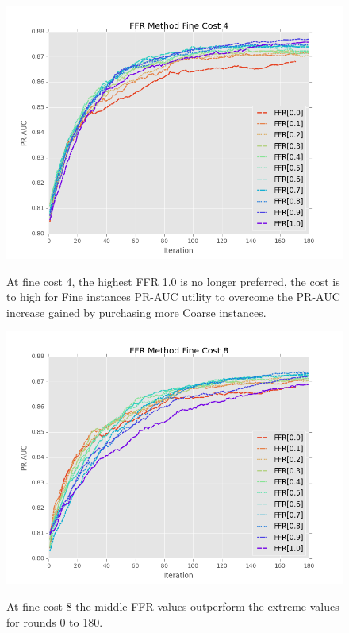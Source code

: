 \documentclass[ms]{nuthesis}
\begin{document}
\FloatBarrier
\begin{figure}[!htb]
	\centering
    \includegraphics[width=1.0\columnwidth]{fig/ParamsFFR_PR_Cost4_rnds0_180}
    \label{fig:ParamsFFR_PR_Cost4_rnds0_180}
    \caption{At fine cost 4, the highest FFR 1.0 is no longer preferred, the
    cost is to high for Fine instances PR-AUC utility to overcome the PR-AUC
    increase gained by purchasing more Coarse instances.}
\end{figure}
\FloatBarrier


\FloatBarrier
\begin{figure}[!htb]
	\centering
    \includegraphics[width=1.0\columnwidth]{fig/ParamsFFR_PR_Cost8_rnds0_180}
    \label{fig:ParamsFFR_PR_Cost8_rnds0_180}
    \caption{At fine cost 8 the middle FFR values outperform the extreme values
    for rounds 0 to 180.}
\end{figure}
\FloatBarrier
\end{document}
